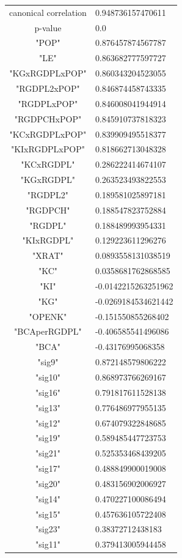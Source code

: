 \documentclass[11pt,a4paper,oneside]{report}
\begin{document}
\begin{tabular}{ c | l }
canonical correlation &  0.948736157470611\\
p-value & 0.0\\
\hline
"POP" & 0.876457874567787\\
"LE" & 0.863682777597727\\
"KGxRGDPLxPOP" & 0.860343204523055\\
"RGDPL2xPOP"& 0.846874458743335\\
"RGDPLxPOP"& 0.846008041944914\\
"RGDPCHxPOP"& 0.845910737818323\\
"KCxRGDPLxPOP"& 0.839909495518377\\
"KIxRGDPLxPOP"& 0.818662713048328\\
"KCxRGDPL"& 0.286222414674107\\
"KGxRGDPL"& 0.263523493822553\\
"RGDPL2"& 0.189581025897181\\
"RGDPCH"& 0.188547823752884\\
"RGDPL"& 0.188489993954331\\
"KIxRGDPL"& 0.129223611296276\\
"XRAT"& 0.0893558131038519\\
"KC"& 0.0358681762868585\\
"KI"& -0.0142215263251962\\
"KG"& -0.0269184534621442\\
"OPENK"& -0.151550855268402\\
"BCAperRGDPL"& -0.406585541496086\\
"BCA"& -0.43176995068358\\
\hline
"sig9"& 0.872148579806222\\
"sig10"& 0.868973766269167\\
"sig16"& 0.791817611528138\\
"sig13"& 0.776486977955135\\
"sig12"& 0.674079322848685\\
"sig19"& 0.589485447723753\\
"sig21"& 0.525353468439205\\
"sig17"& 0.488849900019008\\
"sig20"& 0.483156902006927\\
"sig14"& 0.470227100086494\\
"sig15"& 0.457636105722408\\
"sig23"& 0.38372712438183\\
"sig11"& 0.379413005944458\\

\end{tabular}
\end{document}
